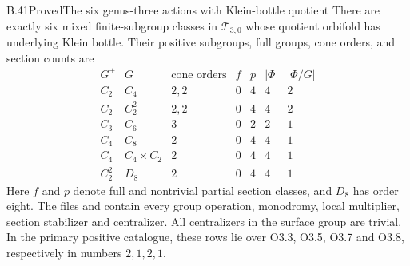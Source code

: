 \begin{claim}{B.41}{Proved}{The six genus-three actions with Klein-bottle quotient}
There are exactly six mixed finite-subgroup classes in
$\mathcal T_{3,0}$ whose quotient orbifold has underlying
Klein bottle.  Their positive subgroups, full groups, cone orders,
and section counts are
\[
\begin{array}{c|c|c|rrrr}
G^+&G&\text{cone orders}&f&p&|\Phi|&|\Phi/G|\\\hline
C_2&C_4&2,2&0&4&4&2\\
C_2&C_2^2&2,2&0&4&4&2\\
C_3&C_6&3&0&2&2&1\\
C_4&C_8&2&0&4&4&1\\
C_4&C_4\times C_2&2&0&4&4&1\\
C_2^2&D_8&2&0&4&4&1
\end{array}                                             \tag{B.41.1}
\]
Here $f$ and $p$ denote full and nontrivial partial section classes,
and $D_8$ has order eight.  The files
 and
 contain
every group operation, monodromy, local multiplier, section
stabilizer and centralizer.  All centralizers in the surface
group are trivial.  In the primary positive catalogue, these
rows lie over O3.3, O3.5, O3.7 and O3.8, respectively in
numbers $2,1,2,1$.
\end{claim}
